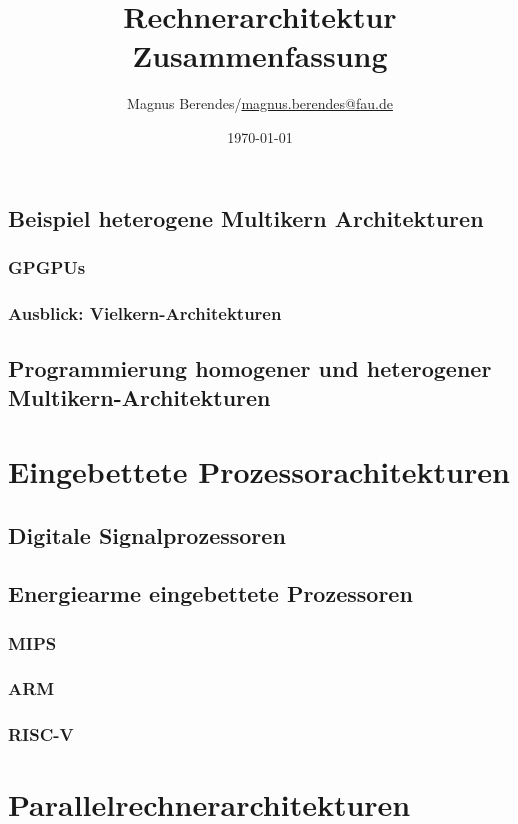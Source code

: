 \documentclass[a4paper,12pt]{scrartcl}
\begin{document}
\title{Rechnerarchitektur Zusammenfassung}
\author{Magnus Berendes/\href{mailto:magnus.berendes@fau.de}{magnus.berendes@fau.de}}
\date{\today}
\maketitle

\newpage


\tableofcontents
\listoftodos


\newpage
{}






\newpage


\subsection{Beispiel heterogene Multikern Architekturen}
\subsubsection{GPGPUs}
\subsubsection{Ausblick: Vielkern-Architekturen}

\subsection{Programmierung homogener und heterogener Multikern-Architekturen}

\newpage
\section{Eingebettete Prozessorachitekturen}
\subsection{Digitale Signalprozessoren}
\subsection{Energiearme eingebettete Prozessoren}
\subsubsection{MIPS}
\subsubsection{ARM}
\subsubsection{RISC-V}

\newpage
\section{Parallelrechnerarchitekturen}
\end{document}
